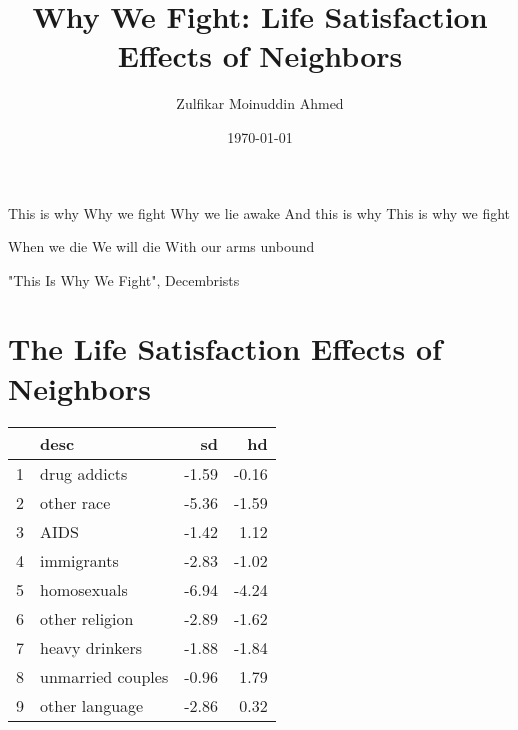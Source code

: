 \documentclass{amsart}
\title{Why We Fight: Life Satisfaction Effects of Neighbors}
\author{Zulfikar Moinuddin Ahmed}
\date{\today}
\begin{document}
\maketitle
\epigraph{This is why
Why we fight
Why we lie awake
And this is why
This is why we fight

When we die
We will die
With our arms unbound
}{"This Is Why We Fight", Decembrists}

\section{The Life Satisfaction Effects of Neighbors}

\begin{table}[ht]
\centering
\begin{tabular}{rlrr}
  \hline
 & desc & sd & hd \\ 
  \hline
1 & drug addicts & -1.59 & -0.16 \\ 
  2 & other race & -5.36 & -1.59 \\ 
  3 & AIDS & -1.42 & 1.12 \\ 
  4 & immigrants & -2.83 & -1.02 \\ 
  5 & homosexuals & -6.94 & -4.24 \\ 
  6 & other religion & -2.89 & -1.62 \\ 
  7 & heavy drinkers & -1.88 & -1.84 \\ 
  8 & unmarried couples & -0.96 & 1.79 \\ 
  9 & other language & -2.86 & 0.32 \\ 
   \hline
\end{tabular}
\end{table}
\end{document}
